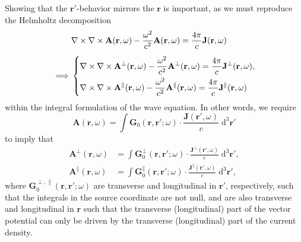 Showing that the $\mathbf{r}'$-behavior mirrors the $\mathbf{r}$ is important, as we must reproduce the Helmholtz decomposition
\begin{equation}\label{eq:waveEquationDerivativeHelmholtzDecomp}
\begin{split}
&\nabla\times\nabla\times\mathbf{A}(\mathbf{r},\omega) - \frac{\omega^2}{c^2}\mathbf{A}(\mathbf{r},\omega) = \frac{4\pi}{c}\mathbf{J}(\mathbf{r},\omega)\\[0.5em]
\implies&
\begin{dcases}
\nabla\times\nabla\times\mathbf{A}^\perp(\mathbf{r},\omega) - \frac{\omega^2}{c^2}\mathbf{A}^\perp(\mathbf{r},\omega) = \frac{4\pi}{c}\mathbf{J}^\perp(\mathbf{r},\omega),\\
\nabla\times\nabla\times\mathbf{A}^\parallel(\mathbf{r},\omega) - \frac{\omega^2}{c^2}\mathbf{A}^\parallel(\mathbf{r},\omega) = \frac{4\pi}{c}\mathbf{J}^\parallel(\mathbf{r},\omega)
\end{dcases}
\end{split}
\end{equation}
within the integral formulation of the wave equation. In other words, we require
\begin{equation}
\mathbf{A}(\mathbf{r},\omega) = \int\mathbf{G}_0(\mathbf{r},\mathbf{r}';\omega)\cdot\frac{\mathbf{J}(\mathbf{r}',\omega)}{c}\;\mathrm{d}^3\mathbf{r}'
\end{equation}
to imply that
\begin{equation}\label{eq:waveEquationIntegralHelmholtzDecomp}
\begin{split}
\mathbf{A}^\perp(\mathbf{r},\omega) &= \int\mathbf{G}_0^\perp(\mathbf{r},\mathbf{r}';\omega)\cdot\frac{\mathbf{J}^\perp(\mathbf{r}',\omega)}{c}\;\mathrm{d}^3\mathbf{r}',\\
\mathbf{A}^\parallel(\mathbf{r},\omega) &= \int\mathbf{G}_0^\parallel(\mathbf{r},\mathbf{r}';\omega)\cdot\frac{\mathbf{J}^\parallel(\mathbf{r}',\omega)}{c}\;\mathrm{d}^3\mathbf{r}',
\end{split}
\end{equation}
where $\mathbf{G}_0^{\perp,\parallel}(\mathbf{r},\mathbf{r}';\omega)$ are transverse and longitudinal in $\mathbf{r}'$, respectively, such that the integrals in the source coordinate are not null, and are also transverse and longitudinal in $\mathbf{r}$ such that the transverse (longitudinal) part of the vector potential can only be driven by the transverse (longitudinal) part of the current density.

